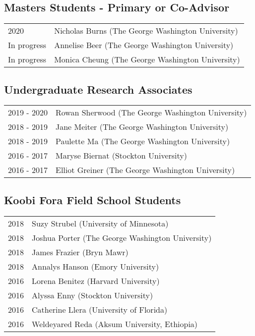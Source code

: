 \documentclass{article}
\begin{document}
\subsection*{Masters Students - Primary or Co-Advisor}
\begin{tabular}{p{}p{}}
2020 & Nicholas Burns (The George Washington University)\\[4pt]
In progress & Annelise Beer (The George Washington University)\\[4pt]
In progress & Monica Cheung (The George Washington University)\\[4pt]
\end{tabular}


\subsection*{Undergraduate Research Associates}
\begin{tabular}{p{}p{}}
2019 - 2020 & Rowan Sherwood (The George Washington University)\\[4pt]
2018 - 2019 & Jane Meiter (The George Washington University)\\[4pt]
2018 - 2019 & Paulette Ma (The George Washington University)\\[4pt]
2016 - 2017 & Maryse Biernat (Stockton University)\\[4pt]
2016 - 2017 & Elliot Greiner (The George Washington University)\\
\end{tabular} 

\subsection*{Koobi Fora Field School Students}
\begin{tabular}{p{}p{}}
2018 & Suzy Strubel (University of Minnesota)\\[4pt]
2018 & Joshua Porter (The George Washington University)\\[4pt]
2018 & James Frazier (Bryn Mawr)\\[4pt] 
2018 & Annalys Hanson (Emory University)\\[4pt]
2016 & Lorena Benitez (Harvard University)\\[4pt]
2016 & Alyssa Enny (Stockton University)\\[4pt]
2016 & Catherine Llera (University of Florida)\\[4pt]
2016 & Weldeyared Reda (Aksum University, Ethiopia)\\
\end{tabular}
\end{document}
